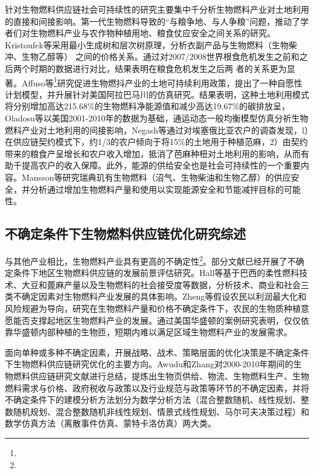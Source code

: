 针对生物燃料供应链社会可持续性的研究主要集中千分析生物燃料产业对土地利用的直接和间接影响。第一代生物燃料导致的“与粮争地、与人争粮”问题，推动了学者们对生物燃料产业与农作物种植用地、粮食仗应安全之间关系的研究。Kristoufek等\cite{Kristoufek2012}采用最小生成树和层次树原理，分析衣副产品与生物燃料（生物柴冲、生物乙醇等） 之间的价格关系。通过对2007/2008世界根食危机发生之前和之后两个时期的数据进行对比，结果表明在粮食危机发生之后两 者的关系更为显著。Affuso等\cite{Affuso2013}\footnote{}研究促进生物燃抖产业的土地可持续利用政策，提出了一种自愿性计划模型，并升展针对美国阿拉巴马川的仿真研究。结果表明，这种土地利用模式将分别增加高达215.68\%的生物燃料净能源值和减少高达19.67\%的碳排放呈，Oladosu等\cite{Oladosu2013}以美国2001-2010年的数据为基础，通运动态一般均衡模型仿真分祈生物燃料产业对土地利用的间接影响，Negash等\cite{Negash2013}通过对埃塞俄比亚农户的调杳发现，l）在供应链契约模式下，约1/3的农户倾向于将15\%的土地用于种植范麻，2）由契约带来的粮食产呈增长和农户收入增加，抵消了芭麻种杻对土地利用的影响，从而有助千提高农户的收入保障。此外，能源的供给安全也是社会可持续性的一个重要内容。Mansson等\cite{Mansson2014}研究瑞典玑有生物燃料（沼气、生物柴油和生物乙醇）的供应安全，并分析通过增加生物燃料产量和使用以实现能源安全和节能减拌目标的可能性。

\subsection{不确定条件下生物燃料供应链优化研究综述}
与其他产业相比，生物燃料产业具有更高的不确定性\cite{An2011}\footnote{}。部分文献已经开展了不确定条件下地区生物燃料供应链的发展前景评估研究。Hall等\cite{Hall2011}基于巴西的柔性燃科技术、大豆和蓖麻产量以及生物燃料的社会接受度等数据，分析技术、商业和社会三类不确定因素对生物燃料产业发展的具体影响。Zheng等\cite{Zheng2012}假设农民以利润最大化和风险规避为导向，研究在生物燃料产量和价格不确定条件下，农民的生物质种植意愿能否支撑起地区生物燃料产业的发展。通过美国华盛顿的案例研究表明，仅仅依靠华盛顿内部种植的生物匝，短期内难以满足区域生物燃料产业的发展需求。

面向单种或多种不确定因素，开展战略、战术、策略层面的优化决策是不确定条件下生物燃料供应链研究优化的主要方向。Awudu和Zhang\cite{Awudu2012}对2000-2010年期间的生物燃料供应链研究文献进行总结，提炼出生物页供给、物流、生物燃料生产、生物燃料需求与价格、政府税收与政策以及行业规范与政策等环节的不确定因素，并将不确定条件下的建模分析方法划分为数学分析方法（混合整数随机、线性规划、整数随机规划、混合整数随机非线性规划、情景式线性规划、马尔可夫决策过程）和数学仿真方法（离散事件仿真、蒙特卡洛仿真）两大类。

